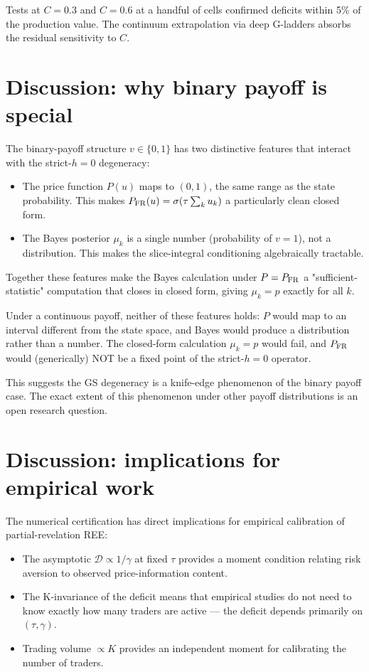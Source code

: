 \documentclass[11pt]{article}
\newcommand{\1}{\mathbf{1}}
\newcommand{\deficit}{\mathcal{D}}
\newcommand{\PFR}{P_{\rm FR}}
\begin{document}
Tests at $C = 0.3$ and $C = 0.6$ at a handful of cells confirmed
deficits within 5\% of the production value.  The continuum
extrapolation via deep G-ladders absorbs the residual sensitivity to $C$.

\section{Discussion: why binary payoff is special}

The binary-payoff structure $v \in \{0, 1\}$ has two distinctive
features that interact with the strict-$h=0$ degeneracy:

\begin{itemize}
\item The price function $P(u)$ maps to $(0, 1)$, the same range as the
state probability.  This makes $\PFR(u) = \sigma(\tau \sum_k u_k)$ a
particularly clean closed form.
\item The Bayes posterior $\mu_k$ is a single number (probability of $v
= 1$), not a distribution.  This makes the slice-integral conditioning
algebraically tractable.
\end{itemize}

Together these features make the Bayes calculation under $P = \PFR$ a
"sufficient-statistic" computation that closes in closed form, giving
$\mu_k = p$ exactly for all $k$.

Under a continuous payoff, neither of these features holds: $P$ would
map to an interval different from the state space, and Bayes would
produce a distribution rather than a number.  The closed-form
calculation $\mu_k = p$ would fail, and $\PFR$ would (generically)
NOT be a fixed point of the strict-$h=0$ operator.

This suggests the GS degeneracy is a knife-edge phenomenon of the
binary payoff case.  The exact extent of this phenomenon under other
payoff distributions is an open research question.

\section{Discussion: implications for empirical work}

The numerical certification has direct implications for empirical
calibration of partial-revelation REE:

\begin{itemize}
\item The asymptotic $\deficit \propto 1/\gamma$ at fixed $\tau$
provides a moment condition relating risk aversion to observed
price-information content.
\item The K-invariance of the deficit means that empirical studies do
not need to know exactly how many traders are active — the deficit
depends primarily on $(\tau, \gamma)$.
\item Trading volume $\propto K$ provides an independent moment for
calibrating the number of traders.
\end{itemize}
\end{document}
